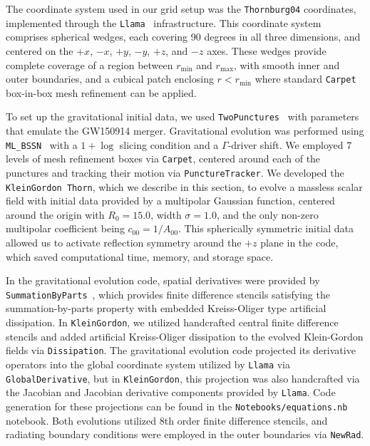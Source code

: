 The coordinate system used in our grid setup was the \texttt{Thornburg04} coordinates, implemented through the \texttt{Llama}~\cite{PhysRevD.83.044045} infrastructure. This coordinate system comprises spherical wedges, each covering 90 degrees in all three dimensions, and centered on the $+x$, $-x$, $+y$, $-y$, $+z$, and $-z$ axes. These wedges provide complete coverage of a region between $r_\text{min}$ and $r_\text{max}$, with smooth inner and outer boundaries, and a cubical patch enclosing $r < r_\text{min}$ where standard \texttt{Carpet}~\cite{Schnetter:2003rb} box-in-box mesh refinement can be applied.

To set up the gravitational initial data, we used \texttt{TwoPunctures}~\cite{Ansorg:2004ds} with parameters that emulate the GW150914 merger. Gravitational evolution was performed using \texttt{ML\_BSSN}~\cite{Brown:2008sb,Kranc:web,McLachlan:web} with a $1+\log$ slicing condition and a $\Gamma$-driver shift. We employed 7 levels of mesh refinement boxes via \texttt{Carpet}, centered around each of the punctures and tracking their motion via \texttt{PunctureTracker}. We developed the \texttt{KleinGordon Thorn}, which we describe in this section, to evolve a massless scalar field with initial data provided by a multipolar Gaussian function, centered around the origin with $R_0 = 15.0$, width $\sigma = 1.0$, and the only non-zero multipolar coefficient being $c_{00} = 1 / A_{00}$. This spherically symmetric initial data allowed us to activate reflection symmetry around the $+z$ plane in the code, which saved computational time, memory, and storage space.

In the gravitational evolution code, spatial derivatives were provided by \texttt{SummationByParts}~\cite{Diener:2005tn}, which provides finite difference stencils satisfying the summation-by-parts property with embedded Kreiss-Oliger type artificial dissipation. In \texttt{KleinGordon}, we utilized handcrafted central finite difference stencils and added artificial Kreiss-Oliger dissipation to the evolved Klein-Gordon fields via \texttt{Dissipation}. The gravitational evolution code projected its derivative operators into the global coordinate system utilized by \texttt{Llama} via \texttt{GlobalDerivative}, but in \texttt{KleinGordon}, this projection was also handcrafted via the Jacobian and Jacobian derivative components provided by \texttt{Llama}. Code generation for these projections can be found in the \texttt{Notebooks/equations.nb} notebook. Both evolutions utilized 8th order finite difference stencils, and radiating boundary conditions were employed in the outer boundaries via \texttt{NewRad}.

